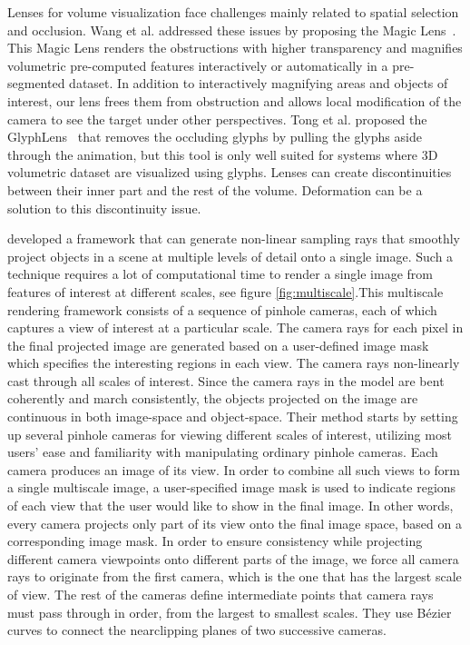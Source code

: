 Lenses for volume visualization face challenges mainly related to spatial selection and occlusion. Wang et al. addressed these issues by proposing the Magic Lens~\cite{1532818}. This Magic Lens renders the obstructions with higher transparency and magnifies volumetric pre-computed features interactively or automatically in a pre-segmented dataset. In addition to interactively magnifying areas and objects of interest, our lens frees them from obstruction and allows local modification of the camera to see the target under other perspectives. Tong et al. proposed the GlyphLens~\cite{7539643} that removes the occluding glyphs by pulling the glyphs aside through the animation, but this tool is only well suited for systems where 3D volumetric dataset are visualized using glyphs. Lenses can create discontinuities between their inner part and the rest of the volume. Deformation can be a solution to this discontinuity issue.   




 \cite{Hsu:2011:RFM:2070781.2024165} developed a framework that can generate non-linear sampling rays that smoothly project objects in a scene at multiple levels of detail onto a single image. Such a technique requires a lot of computational time to render a single image from features of interest at different scales, see figure \ref{fig:multiscale}.This  multiscale rendering framework consists of a sequence of pinhole cameras, each of which captures a view of interest at a particular scale. The camera rays for each pixel in the final projected image are generated based on a user-defined image mask which specifies the interesting regions in each view.  The camera rays non-linearly cast through all scales of interest. Since the camera rays in the model are bent coherently and march consistently, the objects projected on the image are continuous in both image-space and object-space. 
 Their method starts by setting up several pinhole cameras for viewing different scales of interest, utilizing most users’ ease and familiarity with manipulating ordinary pinhole cameras. Each camera produces an image of its view. In order to combine all such views to form a single multiscale image, a user-specified image mask is used to indicate regions of each view that the user would like to show in the final image. In other words, every camera projects only part of its view onto the final image space, based on a corresponding image mask. In order to ensure consistency while projecting different camera
viewpoints onto different parts of the image, we force all camera rays to originate from the first camera, which is the one that has the largest scale of view. The rest of the cameras define intermediate
points that camera rays must pass through in order, from the largest to smallest scales. They use B\'ezier curves to connect the nearclipping planes of two successive cameras.

